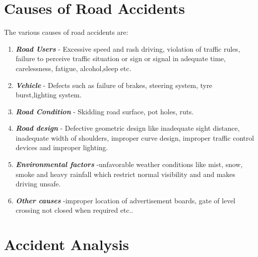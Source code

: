 \section{Causes of Road Accidents}
The various causes of road accidents are:
\begin{enumerate}
	\item \textbf{\textit{Road Users}} - Excessive speed and rash driving, violation of traffic rules, failure to perceive traffic situation or sign or signal in adequate time, carelessness, fatigue, alcohol,sleep etc.
	\item \textbf{\textit{Vehicle}} - Defects such as failure of brakes, steering system, tyre burst,lighting system.
	\item \textbf{\textit{Road Condition}} - Skidding road surface, pot holes, ruts.
	\item \textbf{\textit{Road design}} - Defective geometric design like inadequate sight distance, inadequate width of shoulders, improper curve design, improper traffic control devices and improper lighting.
	\item \textbf{\textit{Environmental factors}} -unfavorable weather conditions like mist, snow, smoke and heavy rainfall which restrict normal visibility and and makes driving unsafe.
	\item \textbf{\textit{Other causes}} -improper location of advertisement boards, gate of level crossing not closed when required etc..
\end{enumerate}
\section{Accident Analysis}
